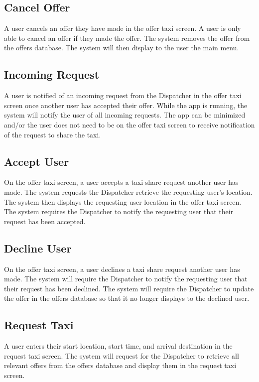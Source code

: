 \documentclass[english]{article}
\begin{document}
\subsection{Cancel Offer}
A user cancels an offer they have made in the offer taxi screen. A user is only able to cancel an offer if they made the offer. The system removes the offer from the offers database. The system will then display to the user the main menu. 
\subsection{Incoming Request}
A user is notified of an incoming request from the Dispatcher in the offer taxi screen once another user has accepted their offer. While the app is running, the system will notify the user of all incoming requests. The app can be minimized and/or the user does not need to be on the offer taxi screen to receive notification of the request to share the taxi. 
\subsection{Accept User}
On the offer taxi screen, a user accepts a taxi share request another user has made. The system requests the Dispatcher retrieve the requesting user's location. The system then displays the requesting user location in the offer taxi screen. The system requires the Dispatcher to notify the requesting user that their request has been accepted.  
\subsection{Decline User}
On the offer taxi screen, a user declines a taxi share request another user has made. The system will require the Dispatcher to notify the requesting user that their request has been declined. The system will require the Dispatcher to update the offer in the offers database so that it no longer displays to the declined user.
\subsection{Request Taxi}
A user enters their start location, start time, and arrival destination in the request taxi screen. The system will request for the Dispatcher to retrieve all relevant offers from the offers database and display them in the request taxi screen. 
\end{document}
